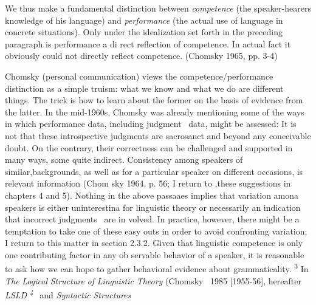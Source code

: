 \begin{styleStandard}
We thus make a fundamental distinction between \textit{competence}\textit{ }(the speaker-hearer{\textquotesingle}s knowledge of his language) and \textit{performance}\textit{ }(the actual use of language in concrete situations). Only under the idealization set forth in the preceding paragraph is performance a di\- rect reflection of competence. In actual fact it obviously could not directly reflect competence. (Chomsky 1965, pp. 3-4)
\end{styleStandard}


\begin{styleStandard}
Chomsky (personal communication) views the competence/performance distinction as a simple truism: what we know and what we do are different things. The trick is how to learn about the former on the basis of evidence from the latter. In the mid-1960s, Chomsky was already mentioning some of the ways in which performance data, including judgment \ data, might be assessed: {\textquotedbl}It is not that these introspective judgments are sacrosanct and beyond any conceivable doubt. On the contrary, their correctness can be challenged and supported in many ways, some quite indirect. Consistency among speakers of similar,backgrounds, as well as for a particular speaker on different occasions, is relevant information{\textquotedbl} (Chom\- sky 1964, p. 56; I return to ,these suggestions in chapters 4 and 5). Nothing in the above passaaes implies that variation amona speakers is either uninterestina for linguistic theory or necessarily an indication that incorrect judgments \ are in\- volved. In practice, however, there might be a temptation to take one of these easy outs in order to avoid confronting variation; I return to this matter in section 2.3.2. Given that linguistic competence is only one contributing factor in any ob\- servable behavior of a speaker, it is reasonable to ask how we can hope to gather behavioral evidence about grammaticality. \textsuperscript{3}\textsuperscript{ }In \textit{The}\textit{ }\textit{Logical}\textit{ }\textit{Structure}\textit{ }\textit{of}\textit{ }\textit{Linguistic}\textit{ }\textit{Theory}\textit{ }(Chomsky \ 1985 [1955-56], hereafter \textit{LSLD}\textit{ }\textit{\textsuperscript{4 }}\textit{\textsuperscript{\ }}and \textit{Syntactic}\textit{ }\textit{Structures}
\end{styleStandard}


